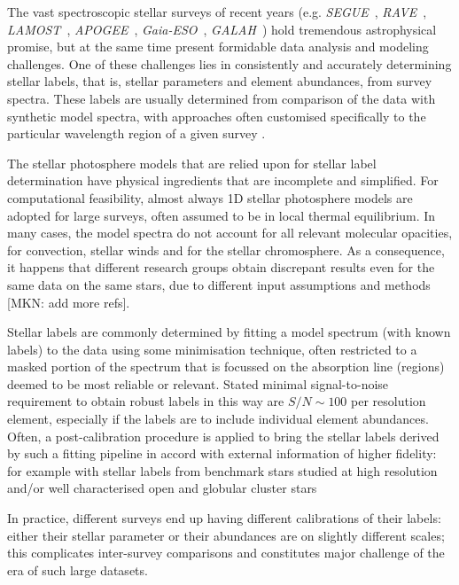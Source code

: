 \documentclass[12pt, preprint]{aastex}
\newcommand{\apogee}{\textsl{APOGEE}}
\newcommand{\galah}{\textsl{GALAH}}
\newcommand{\segue}{\textsl{SEGUE}}
\newcommand{\gaiaeso}{\textsl{Gaia-ESO}}
\newcommand{\rave}{\textsl{RAVE}}
\newcommand{\lamost}{\textsl{LAMOST}}
\begin{document}
The vast spectroscopic stellar surveys of recent years (e.g. \segue\ \citep{Beers2006}, \rave\ \citep{Steinmetz2006}, \lamost\ \citep{Newberg2012}, \apogee\ \citep{Majewski2012}, \gaiaeso\ \citep{Gilmore2012}, \galah\ \citep{Freeman2012}) hold tremendous astrophysical promise, but at the same time present formidable data analysis and modeling challenges. 
One of these challenges lies in consistently and accurately determining stellar labels, that is, stellar parameters and element abundances, from survey spectra. 
These labels are usually determined from comparison of the data with synthetic model spectra, with approaches often 
customised specifically to the particular wavelength region of a given survey \citep[e.g.][]{ Lee2006, Boeche2011, Liu2014, Meszaros2013, Sm2014}. 

The stellar photosphere models that are relied upon for stellar label determination have physical ingredients that are incomplete and simplified. 
For computational feasibility, almost always 1D stellar photosphere models are adopted for large surveys, often assumed to be in local thermal equilibrium. 
In many cases, the model spectra do not account for all relevant  molecular opacities, for convection, stellar winds and for the stellar chromosphere. 
As a consequence, it happens that different research groups obtain discrepant results even for the same data on the same stars, due to different input assumptions and methods \citep[e.g.][]{Sm2014} [MKN: add more refs]. 

Stellar labels are commonly determined by fitting a model spectrum (with known labels) to the data using some minimisation technique, often restricted to a masked portion of the spectrum that is focussed on the absorption line (regions) deemed to be most reliable or relevant. 
Stated minimal signal-to-noise requirement to obtain robust labels in this way are $S/N\sim 100$ per resolution element, especially if the labels are to include individual element abundances. 
Often, a post-calibration procedure is applied to bring the stellar labels derived by such a fitting pipeline in accord with external information of higher fidelity: for example with stellar labels from benchmark stars studied at high resolution and/or well characterised open and globular cluster stars \citep[e.g.][]{Meszaros2013, Freeman2013}

In practice, different surveys end up having different calibrations of their labels: either their stellar parameter or their abundances are on slightly different scales; this complicates
inter-survey comparisons and constitutes major challenge of the era of such large datasets. 
\end{document}
